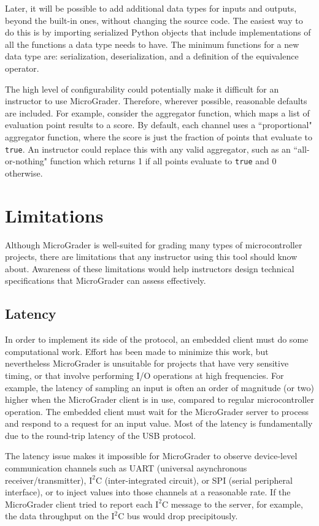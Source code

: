 \documentclass[12pt]{article}
\begin{document}
Later, it will be possible to add additional data types for inputs and outputs, beyond the built-in ones, without changing the source code.  The easiest way to do this is by importing serialized Python objects that include implementations of all the functions a data type needs to have.  The minimum functions for a new data type are: serialization, deserialization, and a definition of the equivalence operator.

The high level of configurability could potentially make it difficult for an instructor to use MicroGrader.  Therefore, wherever possible, reasonable defaults are included.  For example, consider the aggregator function, which maps a list of evaluation point results to a score.  By default, each channel uses a ``proportional" aggregator function, where the score is just the fraction of points that evaluate to \texttt{true}.  An instructor could replace this with any valid aggregator, such as an ``all-or-nothing" function which returns 1 if all points evaluate to \texttt{true} and 0 otherwise.


\clearpage
\section{Limitations}
Although MicroGrader is well-suited for grading many types of microcontroller projects, there are limitations that any instructor using this tool should know about.  Awareness of these limitations would help instructors design technical specifications that MicroGrader can assess effectively.

\subsection{Latency}
In order to implement its side of the protocol, an embedded client must do some computational work.  Effort has been made to minimize this work, but nevertheless MicroGrader is unsuitable for projects that have very sensitive timing, or that involve performing I/O operations at high frequencies.  For example, the latency of sampling an input is often an order of magnitude (or two) higher when the MicroGrader client is in use, compared to regular microcontroller operation.  The embedded client must wait for the MicroGrader server to process and respond to a request for an input value.  Most of the latency is fundamentally due to the round-trip latency of the USB protocol.

The latency issue makes it impossible for MicroGrader to observe device-level communication channels such as UART (universal asynchronous receiver/transmitter), $\text{I}^2\text{C}$ (inter-integrated circuit), or SPI (serial peripheral interface), or to inject values into those channels at a reasonable rate.  If the MicroGrader client tried to report each $\text{I}^2\text{C}$ message to the server, for example, the data throughput on the $\text{I}^2\text{C}$ bus would drop precipitously.
\end{document}
